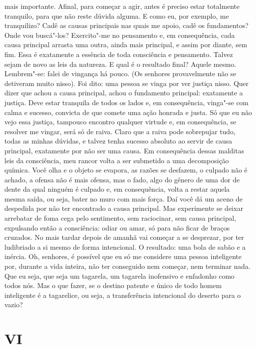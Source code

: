 mais importante. Afinal, para começar a agir, antes é preciso estar
totalmente tranquilo, para que não reste dúvida alguma. E como eu, por
exemplo, me tranquilizo? Cadê as causas principais nas quais me apoio,
cadê os fundamentos? Onde vou buscá"-los? Exercito"-me no pensamento e, em
consequência, cada causa principal arrasta uma outra, ainda mais
principal, e assim por diante, sem fim. Essa é exatamente a essência de
toda consciência e pensamento. Talvez sejam de novo as leis da natureza.
E qual é o resultado final? Aquele mesmo. Lembrem"-se: falei de vingança
há pouco. (Os senhores provavelmente não se detiveram muito nisso). Foi
dito: uma pessoa se vinga por ver justiça nisso. Quer dizer que achou a
causa principal, achou o fundamento principal: exatamente a justiça.
Deve estar tranquila de todos os lados e, em consequência, vinga"-se com
calma e sucesso, convicta de que comete uma ação honrada e justa. Só que
eu não vejo essa justiça, tampouco encontro qualquer virtude e, em
consequência, se resolver me vingar, será só de raiva. Claro que a raiva
pode sobrepujar tudo, todas as minhas dúvidas, e talvez tenha sucesso
absoluto ao servir de causa principal, exatamente por não ser uma causa.
Em consequência dessas malditas leis da consciência, meu rancor volta a
ser submetido a uma decomposição química. Você olha e o objeto se
evapora, as razões se desfazem, o culpado não é achado, a ofensa não é
mais ofensa, mas o fado, algo do gênero de uma dor de dente da qual
ninguém é culpado e, em consequência, volta a restar aquela mesma saída,
ou seja, bater no muro com mais força. Daí você dá um aceno de despedida
por não ter encontrado a causa principal. Mas experimente se deixar
arrebatar de foma cega pelo sentimento, sem raciocinar, sem causa
principal, expulsando então a consciência: odiar ou amar, só para não
ficar de braços cruzados. No mais tardar depois de amanhã vai começar a
se desprezar, por ter ludibriado a si mesmo de forma intencional. O
resultado: uma bola de sabão e a inércia. Oh, senhores, é possível que
eu só me considere uma pessoa inteligente por, durante a vida inteira,
não ter conseguido nem começar, nem terminar nada. Que eu seja, que seja
um tagarela, um tagarela inofensivo e enfadonho como todos nós. Mas o
que fazer, se o destino patente e único de todo homem inteligente é a
tagarelice, ou seja, a transferência intencional do deserto para o
vazio?

\section{VI}

